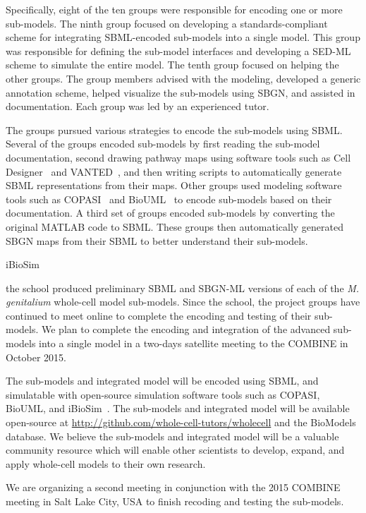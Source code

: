 \documentclass[journal,transmag]{IEEEtran}
\begin{document}
Specifically, eight of the ten groups were responsible for encoding one or more sub-models. The ninth group focused on developing a standards-compliant scheme for integrating SBML-encoded sub-models into a single model. This group was responsible for defining the sub-model interfaces and developing a SED-ML scheme to simulate the entire model.
The tenth group focused on helping the other groups.
The group members advised with the modeling, developed a generic annotation scheme, helped visualize the sub-models using SBGN, and assisted in documentation.
Each group was led by an experienced tutor.

The groups pursued various strategies to encode the sub-models using SBML. Several of the groups encoded sub-models by first reading the sub-model documentation, second drawing pathway maps using software tools such as Cell Designer~\cite{funahashi2008celldesigner} and VANTED~\cite{Rohn2012}, and then writing scripts to automatically generate SBML representations from their maps. Other groups used modeling software tools such as COPASI~\cite{Mendes2009} and BioUML~\cite{Kolpakov2006} to encode sub-models based on their documentation. A third set of groups encoded sub-models by converting the original MATLAB code to SBML. These groups then automatically generated SBGN maps from their SBML to better understand their sub-models.

iBioSim

the school produced preliminary SBML and SBGN-ML versions of each of the \textit{M. genitalium} whole-cell model sub-models.
Since the school, the project groups have continued to meet online to complete the encoding and testing of their sub-models.
We plan to complete the encoding and integration of the advanced sub-models into a single model in a two-days satellite meeting to the COMBINE in October 2015. 

The sub-models and integrated model will be encoded using SBML, and simulatable with open-source simulation software tools such as COPASI, BioUML, and iBioSim~\cite{Madsen2012}.
The sub-models and integrated model will be available open-source at \url{http://github.com/whole-cell-tutors/wholecell} and the BioModels database.
We believe the sub-models and integrated model will be a valuable community resource which will enable other scientists to develop, expand, and apply whole-cell models to their own research.

We are organizing a second meeting in conjunction with the 2015 COMBINE meeting in Salt Lake City, USA to finish recoding and testing the sub-models.
\end{document}

